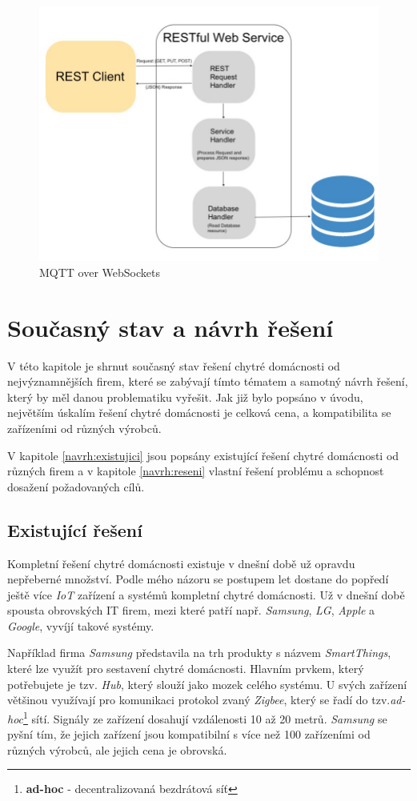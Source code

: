 \begin{figure}[ht]
  \centering
  \includegraphics[width=.63 \linewidth]{obrazky-figures/restful.jpg}
  \caption{MQTT over WebSockets}
  \label{figure:restful}
\end{figure}

\chapter{Současný stav a návrh řešení}
\label{navrh}

V této kapitole je shrnut současný stav řešení chytré domácnosti od nejvýznamnějších firem, které se zabývají tímto tématem a samotný návrh řešení, který by měl danou problematiku vyřešit.
Jak již bylo popsáno v úvodu, největším úskalím řešení chytré domácnosti je celková cena, a kompatibilita se zařízeními od různých výrobců.

V kapitole \ref{navrh:existujici} jsou popsány existující řešení chytré domácnosti od různých firem a v kapitole \ref{navrh:reseni} vlastní řešení problému a schopnost dosažení požadovaných cílů.

\section*{Existující řešení}
\label{navrh:existujici}

Kompletní řešení chytré domácnosti existuje v dnešní době už opravdu nepřeberné množství. Podle mého názoru se postupem let dostane do popředí ještě více \emph{IoT} zařízení a systémů kompletní chytré domácnosti.
Už v dnešní době spousta obrovských IT firem, mezi které patří např. \emph{Samsung}, \emph{LG}, \emph{Apple} a \emph{Google}, vyvíjí takové systémy.

Například firma \emph{Samsung} představila na trh produkty s názvem \emph{SmartThings}, které lze využít pro sestavení chytré domácnosti.
Hlavním prvkem, který potřebujete je tzv. \emph{Hub}, který slouží jako mozek celého systému.
U svých zařízení většinou využívají pro komunikaci protokol zvaný \emph{Zigbee}, který se řadí do tzv.\emph{ad-hoc}\footnote{\textbf{ad-hoc} - decentralizovaná bezdrátová síť} sítí.
Signály ze zařízení dosahují vzdálenosti 10 až 20 metrů.
\emph{Samsung} se pyšní tím, že jejich zařízení jsou kompatibilní s více než 100 zařízeními od různých výrobců, ale jejich cena je obrovská.

